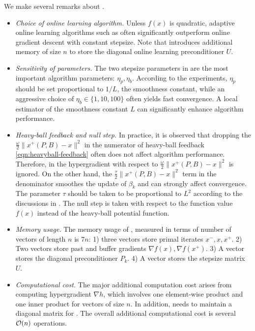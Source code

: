We make several remarks about . 

\begin{itemize}[leftmargin=10pt]
\item \textit{Choice of online learning algorithm.} Unless $f(x)$ is quadratic, adaptive online learning algorithms such as {\adagrad} often significantly outperform online gradient descent with constant stepsize. Note that {\adagrad} introduces additional memory of size $n$ to store the diagonal online learning preconditioner $U$.

\item \textit{Sensitivity of parameters.} The two stepsize parameters in {\adagrad} are the most important algorithm parameters: $\eta_p, \eta_b$. According to the experiments, $\eta_p$ should be set proportional to $1/L$, the smoothness constant, while an aggressive choice of $\eta_b \in \{1,10,100\}$ often yields fast convergence. A local estimator of the smoothness constant $L$ can significantly enhance algorithm performance.
\item \textit{Heavy-ball feedback and null step.} In practice, it is observed that dropping the $\frac{\omega}{2}\|x^+(P, B) - x\|^2$ in the numerator of heavy-ball feedback \eqref{eqn:heavyball-feedback} often does not affect algorithm performance. Therefore, in  the hypergradient with respect to $\frac{\omega}{2}\|x^+(P, B) - x\|^2$ is ignored. 
On the other hand, the $\frac{\tau} {2}\|x^+(P, B) - x\|^2$  term in the denominator smoothes the update of $\beta_k$ and can strongly affect convergence. The parameter $\tau$ should be taken to be proportional to $L^2$ according to the discussions in . The null step is taken with respect to the function value $f(x)$ instead of the heavy-ball potential function.
\item \textit{Memory usage.} The memory usage of {\hdmbest}, measured in terms of number of vectors of length $n$ is $7n$: 1) three vectors store primal iterates $x^{-}, x, x^{+}$. 2) Two vectors store past and buffer gradients $\nabla f(x), \nabla f(x^+)$. 3) A vector stores the diagonal preconditioner $P_k$. 4) A vector stores the {\adagrad} stepsize matrix $U$.
\item \textit{Computational cost. } The major additional computation cost arises from computing hypergradient $\nabla h$, which involves one element-wise product and one inner product for vectors of size $n$. In addition, {\hdmbest} needs to maintain a diagonal matrix for {\adagrad}. The overall additional computational cost is several $\mathcal{O}({n})$ operations.
\end{itemize}
